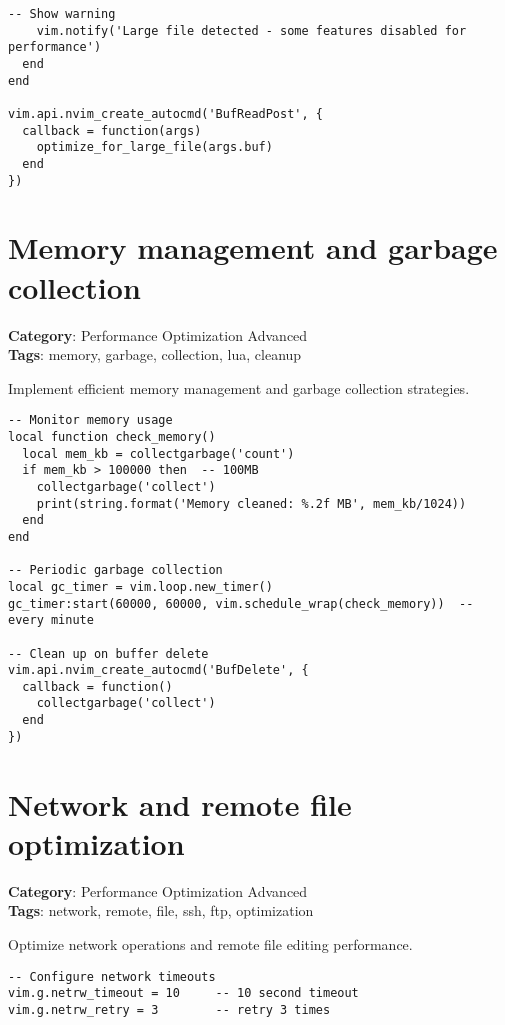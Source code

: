 {{{{{{{{{{\begin{Exa*}{}
\begin{Verbatim}[fontsize=\footnotesize, breaklines, breakanywhere]
    -- Show warning
    vim.notify('Large file detected - some features disabled for performance')
  end
end

vim.api.nvim_create_autocmd('BufReadPost', {
  callback = function(args)
    optimize_for_large_file(args.buf)
  end
})
\end{Verbatim}
\end{Exa*}

\section{Memory management and garbage collection}

\textbf{Category}: Performance Optimization Advanced\\ \textbf{Tags}: memory, garbage, collection, lua, cleanup
\vspace{0.5cm}

Implement efficient memory management and garbage collection strategies.

\begin{Exa*}{}
\begin{Verbatim}[fontsize=\footnotesize, breaklines, breakanywhere]
-- Monitor memory usage
local function check_memory()
  local mem_kb = collectgarbage('count')
  if mem_kb > 100000 then  -- 100MB
    collectgarbage('collect')
    print(string.format('Memory cleaned: %.2f MB', mem_kb/1024))
  end
end

-- Periodic garbage collection
local gc_timer = vim.loop.new_timer()
gc_timer:start(60000, 60000, vim.schedule_wrap(check_memory))  -- every minute

-- Clean up on buffer delete
vim.api.nvim_create_autocmd('BufDelete', {
  callback = function()
    collectgarbage('collect')
  end
})
\end{Verbatim}
\end{Exa*}

\section{Network and remote file optimization}

\textbf{Category}: Performance Optimization Advanced\\ \textbf{Tags}: network, remote, file, ssh, ftp, optimization
\vspace{0.5cm}

Optimize network operations and remote file editing performance.

\begin{Exa*}{}
\begin{Verbatim}[fontsize=\footnotesize, breaklines, breakanywhere]
-- Configure network timeouts
vim.g.netrw_timeout = 10     -- 10 second timeout
vim.g.netrw_retry = 3        -- retry 3 times


\end{Verbatim}
\end{Exa*}}}}}}}}}}}
